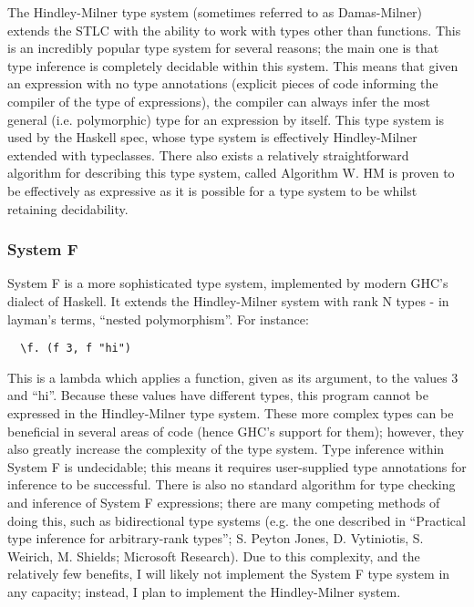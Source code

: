 \documentclass[9pt]{extarticle}
\begin{document}
The Hindley-Milner type system (sometimes referred to as Damas-Milner) extends
the STLC with the ability to work with types other than functions. This
is an incredibly popular type system for several reasons; the main one
is that type inference is completely decidable within this system.  This
means that given an expression with no type annotations (explicit pieces
of code informing the compiler of the type of expressions), the compiler
can always infer the most general (i.e.  polymorphic) type for an
expression by itself. This type system is used by the Haskell spec,
whose type system is effectively Hindley-Milner extended with
typeclasses. There also exists a relatively straightforward algorithm
for describing this type system, called Algorithm W. HM is proven to be
effectively as expressive as it is possible for a type system to be
whilst retaining decidability.

\subsubsection{System F}

System F is a more sophisticated type system, implemented by modern GHC's
dialect of Haskell. It extends the Hindley-Milner system with rank N types - in
layman's terms, ``nested polymorphism''. For instance:

\begin{verbatim}
  \f. (f 3, f "hi")
\end{verbatim}

This is a lambda which applies a function, given as its argument, to the values
3 and ``hi''. Because these values have different types, this program cannot be
expressed in the Hindley-Milner type system. These more complex types can be
beneficial in several areas of code (hence GHC's support for them); however,
they also greatly increase the complexity of the type system. Type inference
within System F is undecidable; this means it requires user-supplied type
annotations for inference to be successful. There is also no standard algorithm
for type checking and inference of System F expressions; there are many
competing methods of doing this, such as bidirectional type systems (e.g. the
one described in ``Practical type inference for arbitrary-rank types''; S. Peyton
Jones, D. Vytiniotis, S. Weirich, M. Shields; Microsoft Research). Due to this
complexity, and the relatively few benefits, I will likely not implement the
System F type system in any capacity; instead, I plan to implement the
Hindley-Milner system.
\end{document}
